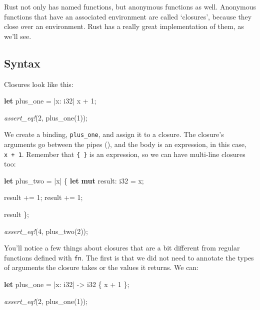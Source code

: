 \documentclass[a4paper,]{book}
\newenvironment{Shaded}{\begin{snugshade}}{\end{snugshade}}
\newcommand{\KeywordTok}[1]{\textcolor[rgb]{0.13,0.29,0.53}{\textbf{{#1}}}}
\newcommand{\DataTypeTok}[1]{\textcolor[rgb]{0.13,0.29,0.53}{{#1}}}
\newcommand{\DecValTok}[1]{\textcolor[rgb]{0.00,0.00,0.81}{{#1}}}
\newcommand{\PreprocessorTok}[1]{\textcolor[rgb]{0.56,0.35,0.01}{\textit{{#1}}}}
\newcommand{\NormalTok}[1]{{#1}}
\begin{document}
Rust not only has named functions, but anonymous functions as well.
Anonymous functions that have an associated environment are called
`closures', because they close over an environment. Rust has a really
great implementation of them, as we'll see.

\subsection{Syntax}\label{syntax}

Closures look like this:

\begin{Shaded}
\begin{Highlighting}[]
\KeywordTok{let} \NormalTok{plus_one = |x: }\DataTypeTok{i32}\NormalTok{| x + }\DecValTok{1}\NormalTok{;}

\PreprocessorTok{assert_eq!}\NormalTok{(}\DecValTok{2}\NormalTok{, plus_one(}\DecValTok{1}\NormalTok{));}
\end{Highlighting}
\end{Shaded}

We create a binding, \texttt{plus\_one}, and assign it to a closure. The
closure's arguments go between the pipes (\texttt{\textbar{}}), and the
body is an expression, in this case, \texttt{x\ +\ 1}. Remember that
\texttt{\{\ \}} is an expression, so we can have multi-line closures
too:

\begin{Shaded}
\begin{Highlighting}[]
\KeywordTok{let} \NormalTok{plus_two = |x| \{}
    \KeywordTok{let} \KeywordTok{mut} \NormalTok{result: }\DataTypeTok{i32} \NormalTok{= x;}

    \NormalTok{result += }\DecValTok{1}\NormalTok{;}
    \NormalTok{result += }\DecValTok{1}\NormalTok{;}

    \NormalTok{result}
\NormalTok{\};}

\PreprocessorTok{assert_eq!}\NormalTok{(}\DecValTok{4}\NormalTok{, plus_two(}\DecValTok{2}\NormalTok{));}
\end{Highlighting}
\end{Shaded}

You'll notice a few things about closures that are a bit different from
regular functions defined with \texttt{fn}. The first is that we did not
need to annotate the types of arguments the closure takes or the values
it returns. We can:

\begin{Shaded}
\begin{Highlighting}[]
\KeywordTok{let} \NormalTok{plus_one = |x: }\DataTypeTok{i32}\NormalTok{| -> }\DataTypeTok{i32} \NormalTok{\{ x + }\DecValTok{1} \NormalTok{\};}

\PreprocessorTok{assert_eq!}\NormalTok{(}\DecValTok{2}\NormalTok{, plus_one(}\DecValTok{1}\NormalTok{));}
\end{Highlighting}
\end{Shaded}
\end{document}
